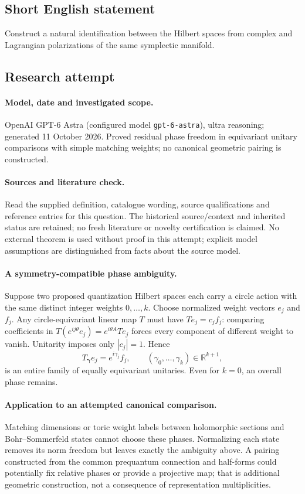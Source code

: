 \documentclass[11pt]{article}
\begin{document}
\subsection{Short English statement}
Construct a natural identification between the Hilbert spaces from complex and Lagrangian polarizations of the same symplectic manifold.
\subsection{Research attempt}
\paragraph{Model, date and investigated scope.}
OpenAI GPT-6 Astra (configured model \texttt{gpt-6-astra}), ultra reasoning; generated 11 October 2026. Proved residual phase freedom in equivariant unitary comparisons with simple matching weights; no canonical geometric pairing is constructed.

\paragraph{Sources and literature check.}
Read the supplied definition, catalogue wording, source qualifications and reference entries for this question. The historical source/context and inherited status are retained; no fresh literature or novelty certification is claimed. No external theorem is used without proof in this attempt; explicit model assumptions are distinguished from facts about the source model.

\paragraph{A symmetry-compatible phase ambiguity.} Suppose two proposed quantization Hilbert spaces each carry a circle action with the same distinct integer weights \(0,\ldots,k\). Choose normalized weight vectors \(e_j\) and \(f_j\). Any circle-equivariant linear map \(T\) must have \(Te_j=c_jf_j\): comparing coefficients in \(T(e^{ij\theta}e_j)=e^{i\theta A}Te_j\) forces every component of different weight to vanish. Unitarity imposes only \(|c_j|=1\). Hence
\[
 T_{\boldsymbol\gamma}e_j=e^{i\gamma_j}f_j,\qquad
 (\gamma_0,\ldots,\gamma_k)\in\mathbb R^{k+1},
\]
is an entire family of equally equivariant unitaries. Even for \(k=0\), an overall phase remains.
\paragraph{Application to an attempted canonical comparison.} Matching dimensions or toric weight labels between holomorphic sections and Bohr--Sommerfeld states cannot choose these phases. Normalizing each state removes its norm freedom but leaves exactly the ambiguity above. A pairing constructed from the common prequantum connection and half-forms could potentially fix relative phases or provide a projective map; that is additional geometric construction, not a consequence of representation multiplicities.
\end{document}
